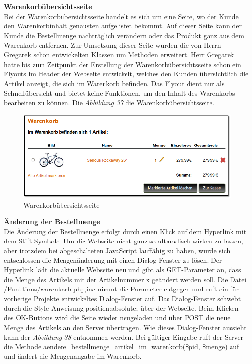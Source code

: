 \textbf{Warenkorbübersichtsseite}\\
Bei der Warenkorbübersichtsseite handelt es sich um eine Seite, wo der Kunde den Warenkorbinhalt genausten aufgelistet bekommt. Auf dieser Seite kann der Kunde die Bestellmenge nachträglich verändern oder das Produkt ganz aus dem Warenkorb entfernen.
Zur Umsetzung dieser Seite wurden die von Herrn Gregarek schon entwickelten Klassen um Methoden erweitert. Herr Gregarek hatte bis zum Zeitpunkt der Erstellung der Warenkorbübersichtsseite schon ein Flyouts im Header der Webseite entwickelt, welches den Kunden übersichtlich die Artikel anzeigt, die sich im Warenkorb befinden. Das Flyout dient nur als Schnellübersicht und bietet keine Funktionen, um den Inhalt des Warenkorbs bearbeiten zu können. Die \textit{Abbildung 37} die Warenkorbübersichtsseite.

\begin{figure}[H]
	\begin{center}
			\includegraphics[width=130mm]{Bilder/warenkorb.png}
	\end{center}
	\caption{Warenkorbübersichtsseite}
\end{figure}

\textbf{Änderung der Bestellmenge}\\
Die Änderung der Bestellmenge erfolgt durch einen Klick auf dem Hyperlink mit dem Stift-Symbole. Um die Webseite nicht ganz so altmodisch wirken zu lassen, aber trotzdem bei abgeschalteten JavaScript lauffähig zu haben, wurde sich entschlossen die Mengenänderung mit einen Dialog-Fenster zu lösen. Der Hyperlink lädt die aktuelle Webseite neu und gibt als \glqq GET-Parameter\grqq{} an, dass die Menge des Artikels mit der Artikelnummer x geändert werden soll. Die Datei \glqq /Funktions/warenkorb.php,inc\grqq{} nimmt die Parameter entgegen und ruft ein für vorherige Projekte entwickeltes Dialog-Fenster auf. Das Dialog-Fenster schwebt durch die Style-Anweisung \glqq position:absolute;\grqq{} über der  Webseite. Beim Klicken des \glqq OK\grqq{}-Buttons wird die Seite wieder neugeladen und über \glqq POST\grqq{} die neue Menge des Artikels an den Server übertragen. Wie dieses Dialog-Fenster aussieht kann der \textit{Abbildung 38} entnommen werden. Bei gültiger Eingabe ruft der Server die Methode \glqq aendere\_bestellmenge\_artikel\_im\_warenkorb(\$pid, \$menge)\grqq{} auf und ändert die Mengenangabe im Warenkorb.


